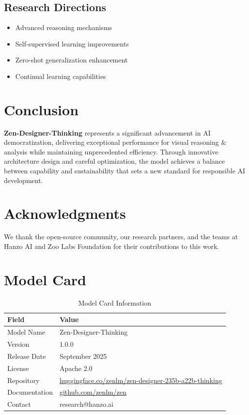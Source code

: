 \documentclass[11pt,a4paper]{article}
\begin{document}
\subsection{Research Directions}
\begin{itemize}
    \item Advanced reasoning mechanisms
    \item Self-supervised learning improvements
    \item Zero-shot generalization enhancement
    \item Continual learning capabilities
\end{itemize}

\section{Conclusion}

\textbf{Zen-Designer-Thinking} represents a significant advancement in AI democratization, 
delivering exceptional performance for visual reasoning \& analysis while maintaining 
unprecedented efficiency. Through innovative architecture design and careful optimization, 
the model achieves a balance between capability and sustainability that sets a new standard 
for responsible AI development.

\section*{Acknowledgments}

We thank the open-source community, our research partners, and the teams at Hanzo AI and 
Zoo Labs Foundation for their contributions to this work.

\appendix

\section{Model Card}

\begin{table}[H]
\centering
\begin{tabular}{ll}
\toprule
\textbf{Field} & \textbf{Value} \\
\midrule
Model Name & Zen-Designer-Thinking \\
Version & 1.0.0 \\
Release Date & September 2025 \\
License & Apache 2.0 \\
Repository & \href{https://huggingface.co/zenlm/zen-designer-235b-a22b-thinking}{huggingface.co/zenlm/zen-designer-235b-a22b-thinking} \\
Documentation & \href{https://github.com/zenlm/zen}{github.com/zenlm/zen} \\
Contact & research@hanzo.ai \\
\bottomrule
\end{tabular}
\caption{Model Card Information}
\end{table}
\end{document}
